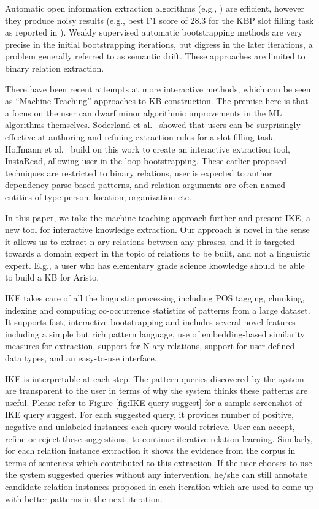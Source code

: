 \documentclass[11pt,letterpaper]{article}
\begin{document}
Automatic open information extraction algorithms (e.g., \cite{Angeli2015LeveragingLS}) are efficient, however they produce noisy results (e.g., best F1 score of 28.3 for the KBP slot filling task as reported in  \cite{Angeli2015LeveragingLS}). Weakly supervised automatic bootstrapping methods \cite{Carlson:wsdm2010,Gupta2014ImprovedPL} are very precise in the initial bootstrapping iterations, but  digress in the later iterations, a problem generally referred to as semantic drift. These approaches are limited to binary relation extraction.
 
There have been recent attempts at more interactive methods, which can be seen as ``Machine Teaching'' \cite{Amershi2014PowerTT,Amershi2015ModelTrackerRP} approaches to KB construction. The premise here is that a focus on the user can dwarf minor algorithmic improvements in the ML algorithms themselves.
Soderland et al.~\cite{Soderland2013OpenIE} showed that users can be surprisingly effective at authoring and refining extraction rules for a slot filling task. Hoffmann et al.~\cite{Hoffmann2015ExtremeEO} build on this work to create an interactive extraction tool, InstaRead, allowing user-in-the-loop bootstrapping.
These earlier proposed techniques are restricted to binary relations, user is expected to author dependency parse based patterns, and relation arguments are often named entities of type person, location, organization etc.

In this paper, we take the machine teaching approach further and present IKE, a new tool for interactive knowledge extraction. Our approach is novel in the sense it allows us to extract n-ary relations between any phrases, and it is targeted towards a domain expert in the topic of relations to be built, and not a linguistic expert. E.g., a user who has elementary grade science knowledge should be able to build a KB for Aristo. 

IKE takes care of all the linguistic processing including POS tagging, chunking, indexing and computing co-occurrence statistics of patterns from a large dataset. It supports fast, interactive bootstrapping and includes several novel features including a simple but rich pattern language, use of embedding-based similarity measures for extraction, support for N-ary relations, support for user-defined data types, and an easy-to-use interface. 

IKE is interpretable at each step.
The pattern queries discovered by the system are transparent to the user in terms of why the system thinks these patterns are useful. Please refer to Figure \ref{fig:IKE-query-suggest} for a sample screenshot of IKE query suggest. 
 For each suggested query, it provides number of positive, negative and unlabeled instances each query would retrieve. User can accept, refine or reject these suggestions, to continue iterative relation learning. 
  Similarly, for each relation instance extraction it shows the evidence from the corpus in terms of sentences which contributed to this extraction. 
If the user chooses to use the system suggested queries without any intervention, he/she can still annotate candidate relation instances proposed in each iteration which are used to come up with better patterns in the next iteration. 
\end{document}
